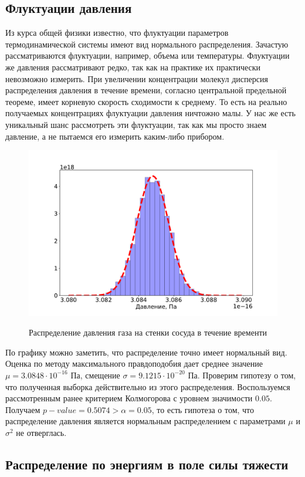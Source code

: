 \documentclass[twoside,twocolumn, 11pt]{article}
\theoremstyle{plain}
\theoremstyle{definition}
\begin{document}
\subsection{Флуктуации давления}
Из курса общей физики известно, что флуктуации параметров термодинамической системы имеют вид нормального распределения.
Зачастую рассматриваются флуктуации, например, объема или температуры. Флуктуации же давления рассматривают редко, так как на
практике их практически невозможно измерить. При увеличении концентрации молекул дисперсия распределения давления в течение времени, согласно
центральной предельной теореме, имеет корневую скорость сходимости к среднему. То есть на реально получаемых концентрациях флуктуации давления
ничтожно малы. У нас же есть уникальный шанс рассмотреть эти флуктуации, так как мы просто знаем давление, а не пытаемся его измерить каким-либо прибором.
\begin{figure}[h!]
{\includegraphics[width=1\linewidth]{hist_p}}
\caption{Распределение давления газа на стенки сосуда в течение временти}
\end{figure}
По графику можно заметить, что распределение точно имеет нормальный вид. Оценка по методу максимального правдоподобия дает
среднее значение $\mu = 3.0848 \cdot 10^{-16}$ Па, смещение $\sigma = 9.1215 \cdot 10^{-20}$ Па. Проверим гипотезу о том, что
полученная выборка действительно из этого распределения. Воспользуемся рассмотренным ранее критерием Колмогорова с уровнем
значимости $0.05$. Получаем $p-value = 0.5074 > \alpha = 0.05$, то есть гипотеза о том, что распределение давления является
нормальным распределением с параметрами $\mu$ и $\sigma^2$ не отверглась.

\subsection{Распределение по энергиям в поле силы тяжести}
\end{document}
